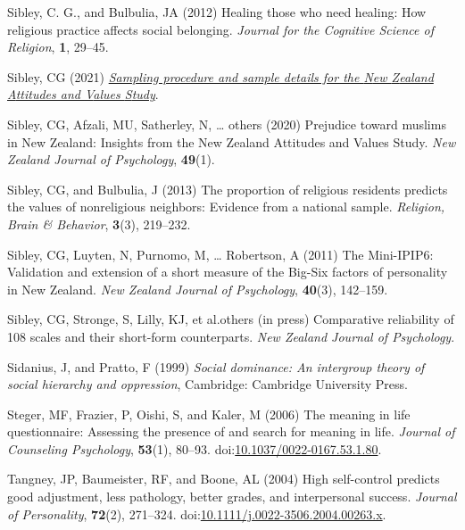 \documentclass[
  single column]{article}
\newlength{\cslhangindent}
\newenvironment{CSLReferences}[2] %
 {\begin{list}{}{%
  \setlength{\itemindent}{0pt}
  \setlength{\leftmargin}{0pt}
  \setlength{\parsep}{0pt}
  \ifodd #1
   \setlength{\leftmargin}{\cslhangindent}
   \setlength{\itemindent}{-1\cslhangindent}
  \fi
  \setlength{\itemsep}{#2\baselineskip}}}
 {\end{list}}
\begin{document}
\begin{CSLReferences}{1}{0}
Sibley, C. G., and Bulbulia, JA (2012) Healing those who need healing:
How religious practice affects social belonging. \emph{Journal for the
Cognitive Science of Religion}, \textbf{1}, 29--45.

Sibley, CG (2021)
\emph{\href{https://doi.org/10.31234/osf.io/wgqvy}{Sampling procedure
and sample details for the {N}ew {Z}ealand {A}ttitudes and {V}alues
{S}tudy}}.

Sibley, CG, Afzali, MU, Satherley, N, \ldots{} others (2020) Prejudice
toward muslims in {N}ew {Z}ealand: Insights from the {N}ew {Z}ealand
{A}ttitudes and {V}alues {S}tudy. \emph{New Zealand Journal of
Psychology}, \textbf{49}(1).

Sibley, CG, and Bulbulia, J (2013) The proportion of religious residents
predicts the values of nonreligious neighbors: Evidence from a national
sample. \emph{Religion, Brain \& Behavior}, \textbf{3}(3), 219--232.

Sibley, CG, Luyten, N, Purnomo, M, \ldots{} Robertson, A (2011) The
Mini-IPIP6: Validation and extension of a short measure of the Big-Six
factors of personality in {N}ew {Z}ealand. \emph{New Zealand Journal of
Psychology}, \textbf{40}(3), 142--159.

Sibley, CG, Stronge, S, Lilly, KJ, et al.others (in press) Comparative
reliability of 108 scales and their short-form counterparts. \emph{New
Zealand Journal of Psychology}.

Sidanius, J, and Pratto, F (1999) \emph{Social dominance: An intergroup
theory of social hierarchy and oppression}, Cambridge: Cambridge
University Press.

Steger, MF, Frazier, P, Oishi, S, and Kaler, M (2006) The meaning in
life questionnaire: Assessing the presence of and search for meaning in
life. \emph{Journal of Counseling Psychology}, \textbf{53}(1), 80--93.
doi:\href{https://doi.org/10.1037/0022-0167.53.1.80}{10.1037/0022-0167.53.1.80}.

Tangney, JP, Baumeister, RF, and Boone, AL (2004) High self-control
predicts good adjustment, less pathology, better grades, and
interpersonal success. \emph{Journal of Personality}, \textbf{72}(2),
271--324.
doi:\href{https://doi.org/10.1111/j.0022-3506.2004.00263.x}{10.1111/j.0022-3506.2004.00263.x}.


\end{CSLReferences}
\end{document}
